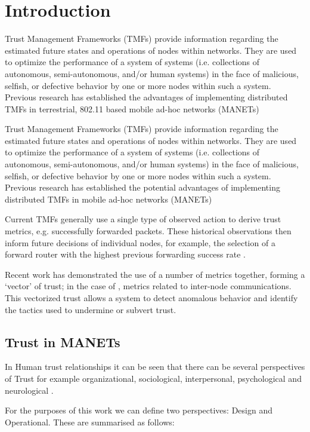\documentclass[runningheads,a4paper]{llncs}
\begin{document}
\section{Introduction}

Trust Management Frameworks (TMFs) provide information regarding the estimated future states and operations of nodes within networks. They are used to optimize the performance of a system of systems (i.e. collections of autonomous, semi-autonomous, and/or human systems) in the face of malicious, selfish, or defective behavior by one or more nodes within such a system. 
Previous research has established the advantages of implementing distributed TMFs in terrestrial, 802.11 based mobile ad-hoc networks (MANETs) \cite{Guo11}

Trust Management Frameworks (TMFs) provide information regarding the estimated future states and operations of nodes within networks. They are used to optimize the performance of a system of systems (i.e. collections of autonomous, semi-autonomous, and/or human systems) in the face of malicious, selfish, or defective behavior by one or more nodes within such a system. Previous research has established the potential advantages of implementing distributed TMFs in mobile ad-hoc networks (MANETs) \cite{Li2007}

Current TMFs generally use a single type of observed action to derive trust metrics, e.g. successfully forwarded packets. These historical observations then inform future decisions of individual nodes, for example, the selection of a forward router with the highest previous forwarding success rate \cite{Li2008}.

Recent work has demonstrated the use of a number of metrics together, forming a ‘vector’ of trust; in the case of \cite{Guo2012}, metrics related to inter-node communications. This vectorized trust allows a system to detect anomalous behavior and identify the tactics used to undermine or subvert trust.

\subsection{Trust in MANETs}\label{sec:trustinmanets}

In Human trust relationships it can be seen that there can be several perspectives of Trust for example organizational, sociological, interpersonal, psychological and neurological \cite{Lee2004}. 

For the purposes of this work we can define two perspectives: Design and Operational. These are summarised as follows:
\end{document}
